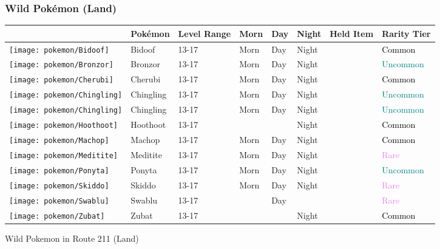 \subsubsection{Wild Pokémon (Land)}%
\label{ssubsec:WildPokmon(Land)}%
\begin{longtable}{||l l l l l l l l||}%
\hline%
&Pokémon&Level Range&Morn&Day&Night&Held Item&Rarity Tier\\%
\hline%
\endhead%
\hline%
\texttt{[image: pokemon/Bidoof]}&Bidoof&13{-}17&Morn&Day&Night&&\textcolor{black}{%
Common%
}\\%
\hline%
\texttt{[image: pokemon/Bronzor]}&Bronzor&13{-}17&Morn&Day&Night&&\textcolor{teal}{%
Uncommon%
}\\%
\hline%
\texttt{[image: pokemon/Cherubi]}&Cherubi&13{-}17&Morn&Day&Night&&\textcolor{black}{%
Common%
}\\%
\hline%
\texttt{[image: pokemon/Chingling]}&Chingling&13{-}17&Morn&Day&Night&&\textcolor{teal}{%
Uncommon%
}\\%
\hline%
\texttt{[image: pokemon/Chingling]}&Chingling&13{-}17&Morn&Day&Night&&\textcolor{teal}{%
Uncommon%
}\\%
\hline%
\texttt{[image: pokemon/Hoothoot]}&Hoothoot&13{-}17&&&Night&&\textcolor{black}{%
Common%
}\\%
\hline%
\texttt{[image: pokemon/Machop]}&Machop&13{-}17&Morn&Day&Night&&\textcolor{black}{%
Common%
}\\%
\hline%
\texttt{[image: pokemon/Meditite]}&Meditite&13{-}17&Morn&Day&Night&&\textcolor{violet}{%
Rare%
}\\%
\hline%
\texttt{[image: pokemon/Ponyta]}&Ponyta&13{-}17&Morn&Day&Night&&\textcolor{teal}{%
Uncommon%
}\\%
\hline%
\texttt{[image: pokemon/Skiddo]}&Skiddo&13{-}17&Morn&Day&Night&&\textcolor{violet}{%
Rare%
}\\%
\hline%
\texttt{[image: pokemon/Swablu]}&Swablu&13{-}17&&Day&&&\textcolor{violet}{%
Rare%
}\\%
\hline%
\texttt{[image: pokemon/Zubat]}&Zubat&13{-}17&&&Night&&\textcolor{black}{%
Common%
}\\%
\hline%
\end{longtable}%
\caption{Wild Pokemon in Route 211 (Land)}